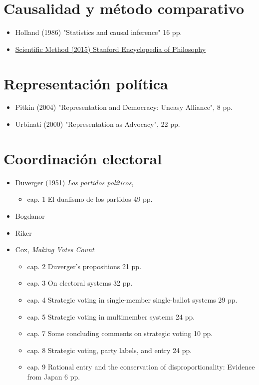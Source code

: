 \documentclass{article}
\begin{document}
\section{Causalidad y método comparativo}
\label{sec:org31b11a3}
\begin{itemize}
\item Holland (1986) "Statistics and causal inference" 16 pp.
\item \href{https://plato.stanford.edu/entries/scientific-method/\#SciMetSciEduSeeSci}{Scientific Method (2015) Stanford Encyclopedia of Philosophy}
\end{itemize}

\section{Representación política}
\label{sec:orgb817910}
\begin{itemize}
\item Pitkin (2004) "Representation and Democracy: Uneasy Alliance", 8 pp.
\item Urbinati (2000) "Representation as Advocacy", 22 pp.
\end{itemize}

\section{Coordinación electoral}
\label{sec:orgcbe821c}
\begin{itemize}
\item Duverger (1951) \emph{Los partidos políticos}, 
\begin{itemize}
\item cap. 1 El dualismo de los partidos 49 pp.
\end{itemize}
\item Bogdanor
\item Riker
\item Cox, \emph{Making Votes Count}
\begin{itemize}
\item cap. 2 Duverger's propositions 21 pp.
\item cap. 3 On electoral systems 32 pp.
\item cap. 4 Strategic voting in single-member single-ballot systems 29 pp.
\item cap. 5 Strategic voting in multimember systems 24 pp.
\item cap. 7 Some concluding comments on strategic voting 10 pp.
\item cap. 8 Strategic voting, party labels, and entry  24 pp.
\item cap. 9 Rational entry and the conservation of disproportionality: Evidence from Japan 6 pp.
\end{itemize}
\end{itemize}
\end{document}

